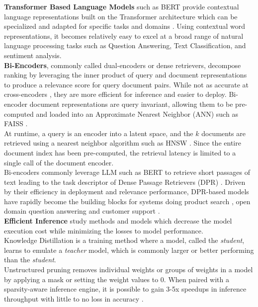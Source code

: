\textbf{Transformer Based Language Models} such as BERT \cite{Devlin2019BERTPO} provide contextual language representations built on the Transformer architecture \cite{Vaswani2017AttentionIA} which can be specialized and adapted for specific tasks and domains \cite{Lee2020BioBERTAP}. Using contextual word representations, it becomes relatively easy to excel at a broad range of natural language processing tasks such as Question Answering, Text Classification, and sentiment analysis. \\
\textbf{Bi-Encoders}, commonly called dual-encoders or dense retrievers, decompose ranking by leveraging the inner product of query and document representations to produce a relevance score for query document pairs. While not as accurate at cross-encoders \cite{Reimers2019SentenceBERTSE}, they are more efficient for inference and easier to deploy. Bi-encoder document representations are query invariant, allowing them to be pre-computed and loaded into an Approximate Nearest Neighbor (ANN) such as FAISS \cite{johnson2019billion}. \\
At runtime, a query is an encoder into a latent space, and the $k$ documents are retrieved using a nearest neighbor algorithm such as HNSW \cite{Malkov2016EfficientAR}. Since the entire document index has been pre-computed, the retrieval latency is limited to a single call of the document encoder. \\
Bi-encoders commonly leverage LLM such as BERT \cite{Devlin2019BERTPO} to retrieve short passages of text leading to the task descriptor of Dense Passage Retrievers (DPR) \cite{Karpukhin2020DensePR}. Driven by their efficiency in deployment and relevance performance, DPR-based models have rapidly become the building blocks for systems doing product search \cite{Magnani2022SemanticRA}, open domain question answering \cite{Karpukhin2020DensePR} and customer support \cite{Mesquita2022DenseTR}.\\
\textbf{Efficient Inference} study methods and models which decrease the model execution cost while minimizing the losses to model performance. \\
Knowledge Distillation \cite{Hinton2015DistillingTK} is a training method where a model, called the \textit{student}, learns to emulate a \textit{teacher} model, which is commonly larger or better performing than the \textit{student}.\\
Unstructured pruning removes individual weights or groups of weights in a model by applying a mask or setting the weight values to 0. When paired with a sparsity-aware inference engine, it is possible to gain 3-5x speedups in inference throughput with little to no loss in accuracy \cite{Kurti2022TheOB}. \\

